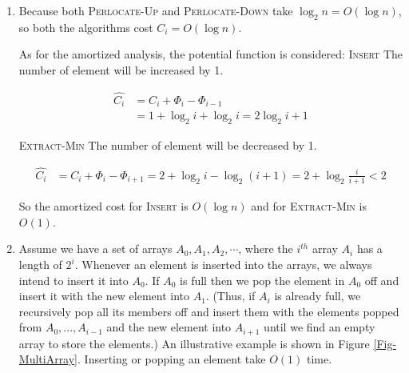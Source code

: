 \documentclass[12pt,a4paper]{article}
\makeatletter
\newtheorem*{solution}{Solution}
\theoremstyle{definition}
\renewenvironment{solution}[1][Solution] {\par\pushQED{\qed}\normalfont\topsep6\p@\@plus6\p@\relax\trivlist\item[\hskip\labelsep\bfseries#1\@addpunct{.}]\ignorespaces}{\popQED\endtrivlist\@endpefalse} \makeatother
\makeatother
\begin{document}
\begin{enumerate}
\begin{solution}
		Because both \textsc{Perlocate-Up} and \textsc{Perlocate-Down} take $\log_2 n = O(\log n)$, so both the algorithms cost $C_i = O(\log n)$.

		As for the amortized analysis, the potential function is considered:
		\textsc{Insert} The number of element will be increased by 1.

		\begin{align*}
			\hat{C_i} &= C_i + \Phi_i - \Phi_{i-1}\\
					&= 1 + \log_2 i + \log_2 i = 2\log_2 i + 1
		\end{align*}

		\textsc{Extract-Min} The number of element will be decreased by 1.

		\begin{align*}
			\hat{C_i} &= C_i + \Phi_i - \Phi_{i+1} = 2 + \log_2 i - \log_2 (i+1) = 2 + \log_2 \frac{i}{i+1} < 2
		\end{align*}

		So the amortized cost for \textsc{Insert} is $O(\log n)$ and for \textsc{Extract-Min} is $O(1)$.

			

			
			
			

		
	\end{solution}

	\item Assume we have a set of arrays $A_0, A_1, A_2,\cdots$, where the $i^{th}$ array $A_i$ has a length of $2^i$. Whenever an element is inserted into the arrays, we always intend to insert it into $A_0$. If $A_0$ is full then we pop the element in $A_0$ off and insert it with the new element into $A_{1}$. (Thus, if $A_{i}$ is already full, we recursively pop all its members off and insert them with the elements popped from $A_0,...,A_{i-1}$ and the new element into $A_{i+1}$ until we find an empty array to store the elements.) An illustrative example is shown in Figure \ref{Fig-MultiArray}. Inserting or popping an element take $O(1)$ time.


\end{enumerate}
\end{document}
